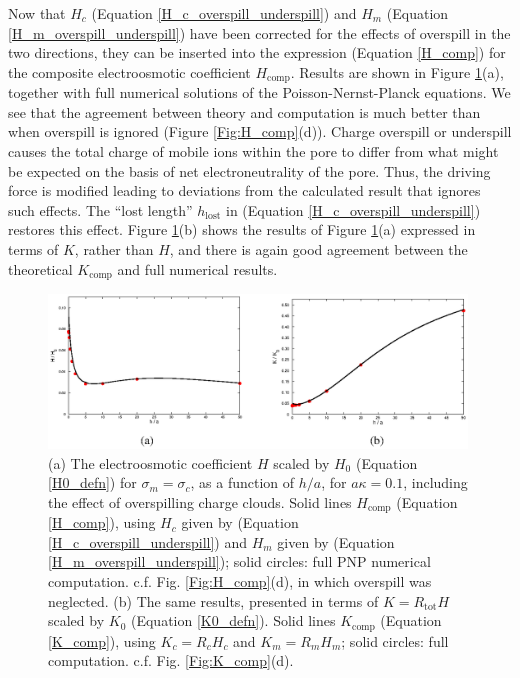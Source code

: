 Now that $H_c$ (Equation \ref{H_c_overspill_underspill}) and 
$H_m$ (Equation \ref{H_m_overspill_underspill})
have been corrected for the effects of overspill
in the two directions, they can be inserted into the expression
(Equation \ref{H_comp})
for the composite electroosmotic coefficient $H_\text{comp}$.
Results are shown in Figure \ref{Fig:H_comp_akappa_small}(a), together
with full numerical solutions of the Poisson-Nernst-Planck equations.
We see that the agreement between theory and computation is much better
than  when overspill is ignored (Figure \ref{Fig:H_comp}(d)). 
Charge overspill or underspill causes the total charge of mobile ions
within the pore to differ
from what might be expected on the basis of net 
electroneutrality of the pore. 
Thus, the driving force is modified leading to deviations from the calculated 
result that ignores such effects. The ``lost length'' $h_\text{lost}$ in (Equation \ref{H_c_overspill_underspill})
restores this effect.
Figure \ref{Fig:H_comp_akappa_small}(b) shows the results of
Figure \ref{Fig:H_comp_akappa_small}(a) expressed in terms of
$K$, rather than $H$, and there is again good agreement between the
theoretical $K_\text{comp}$ and full numerical results.

\begin{figure}[ht]
\includegraphics[width=0.99\textwidth]{finite_thickness/finite_pore_pic8.eps}
\caption{\label{Fig:H_comp_akappa_small}
(a) The electroosmotic coefficient $H$ scaled by $H_0$ (Equation \ref{H0_defn}) for $\sigma_m=\sigma_c$, as a function of $h/a$, for $a\kappa=0.1$, including the effect of overspilling charge clouds. Solid lines $H_\text{comp}$ (Equation \ref{H_comp}), using $H_c$ given by (Equation \ref{H_c_overspill_underspill}) and $H_m$ given by (Equation \ref{H_m_overspill_underspill}); solid circles: full PNP numerical computation. c.f. Fig. \ref{Fig:H_comp}(d), in which overspill was neglected. (b) The same results, presented in terms of $K=R_\text{tot}H$ scaled by $K_0$ (Equation \ref{K0_defn}). Solid lines $K_\text{comp}$ (Equation \ref{K_comp}), using $K_c=R_cH_c$ and $K_m=R_mH_m$; solid circles: full computation. c.f. Fig. \ref{Fig:K_comp}(d).}
\end{figure}

